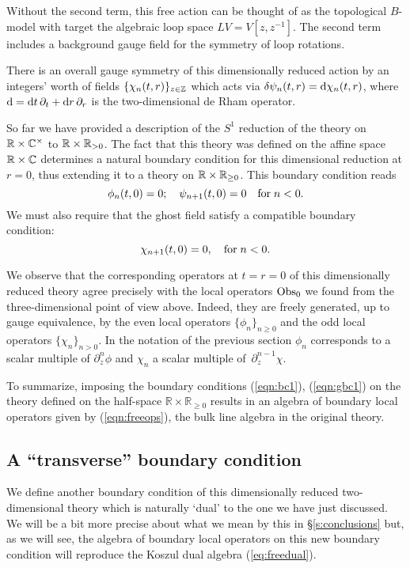 \documentclass[11pt]{amsart}
\begin{document}
Without the second term, this free action can be thought of as the topological $B$-model with target the algebraic loop space $L V = V[z,z^{-1}]$.
The second term includes a background gauge field for the symmetry of loop rotations.

There is an overall gauge symmetry of this dimensionally reduced action by an integers' worth of fields $\{\chi_n (t,r)\}_{z \in \mathbb Z}$ which acts via $\delta \psi_n (t,r) = {\rm d} \chi_n (t,r)$, where ${\rm d} = {\rm d} t \,\partial_t + {\rm d} r \,\partial_r$ is the two-dimensional de Rham operator. 

So far we have provided a description of the $S^1$ reduction of the theory on $\mathbb R \times \mathbb C^\times$ to $\mathbb R \times \mathbb R_{>0}$. 
The fact that this theory was defined on the affine space $\mathbb R \times \mathbb C$ determines a natural boundary condition for this dimensional reduction at $r = 0$, thus extending it to a theory on $\mathbb R \times \mathbb R_{\geq 0}$. 
This boundary condition reads
\begin{equation}\label{eqn:bc1}
\phi_n (t, 0) = 0 ; \quad \psi_{n+1} (t,0) = 0 \quad {\rm for} \; n < 0 .
\end{equation}
We must also require that the ghost field satisfy a compatible boundary condition:
\begin{equation}\label{eqn:gbc1}
\chi_{n+1} (t,0) = 0, \quad {\rm for} \; n < 0 .
\end{equation}

We observe that the corresponding operators at $t = r = 0$ of this dimensionally reduced theory agree precisely with the local operators ${\rm Obs}_0$ we found from the three-dimensional point of view above. 
Indeed, they are freely generated, up to gauge equivalence, by the even local operators $\{\phi_n\}_{n \geq 0}$ and the odd local operators $\{\chi_n\}_{n > 0}$. 
In the notation of the previous section $\phi_n$ corresponds to a scalar multiple of $\partial_z^n \phi$ and $\chi_n$ a scalar multiple of~$\partial^{n-1}_z \chi$. 

To summarize, imposing the boundary conditions (\ref{eqn:bc1}), (\ref{eqn:gbc1}) on the theory defined on the half-space $\mathbb{R} \times \mathbb{R}_{\geq 0}$ results in an algebra of boundary local operators given by (\ref{eqn:freeops}), the bulk line algebra in the original theory.  

\subsection{A ``transverse'' boundary condition}
%
We define another boundary condition of this dimensionally reduced two-dimensional theory which is naturally `dual' to the one we have just discussed. We will be a bit more precise about what we mean by this in \S \ref{s:conclusions} but, as we will see, the algebra of boundary local operators on this new boundary condition will reproduce the Koszul dual algebra (\ref{eq:freedual}).
\end{document}
